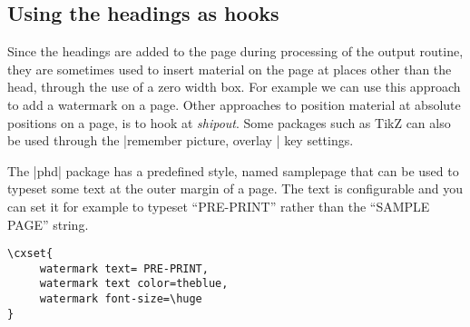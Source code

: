 %
%
%
%






\subsection{Using the headings as hooks}

Since the headings are added to the page during processing of the output routine, they are sometimes used
to insert material on the page at places other than the head, through the use of a zero width box. For example we
can use this approach to add a watermark on a page. Other approaches to position material at absolute positions
on a page, is to hook at \emph{shipout}. Some packages such as TikZ can also be used through the |remember picture, overlay |  key settings. 

The |phd| package has a predefined style, named samplepage that can be used to typeset some text at the outer margin of a page. The text is configurable and you can set it for example to typeset “PRE-PRINT” rather than the “SAMPLE PAGE” string. 

\begin{tcolorbox}
\begin{lstlisting}
\cxset{
     watermark text= PRE-PRINT,
     watermark text color=theblue,
     watermark font-size=\huge
}
\end{lstlisting}
\end{tcolorbox}

